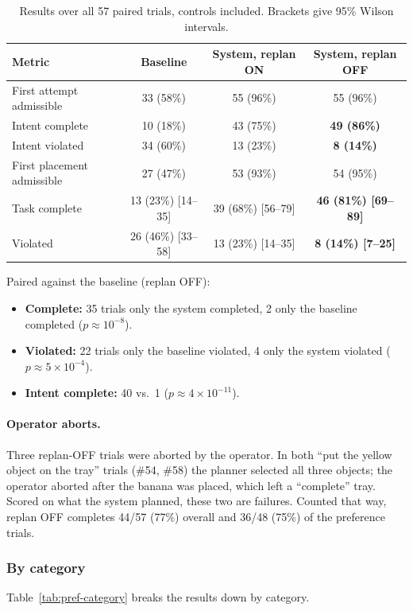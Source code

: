 \begin{table}[t]
  \centering
  \caption{Results over all 57 paired trials, controls included. Brackets give 95\%
    Wilson intervals.}
  \label{tab:pref-headline}
  \begin{tabular}{lccc}
    \toprule
    Metric & Baseline & System, replan ON & System, replan OFF \\
    \midrule
    First attempt admissible   & 33 (58\%) & 55 (96\%) & 55 (96\%) \\
    Intent complete            & 10 (18\%) & 43 (75\%) & \textbf{49 (86\%)} \\
    Intent violated            & 34 (60\%) & 13 (23\%) & \textbf{8 (14\%)} \\
    First placement admissible & 27 (47\%) & 53 (93\%) & 54 (95\%) \\
    \midrule
    Task complete & 13 (23\%) [14--35] & 39 (68\%) [56--79] & \textbf{46 (81\%) [69--89]} \\
    Violated      & 26 (46\%) [33--58] & 13 (23\%) [14--35] & \textbf{8 (14\%) [7--25]} \\
    \bottomrule
  \end{tabular}
\end{table}

Paired against the baseline (replan OFF):
\begin{itemize}
  \item \textbf{Complete:} 35 trials only the system completed, 2 only the baseline
    completed ($p \approx 10^{-8}$).
  \item \textbf{Violated:} 22 trials only the baseline violated, 4 only the system
    violated ($p \approx 5 \times 10^{-4}$).
  \item \textbf{Intent complete:} 40 vs.\ 1 ($p \approx 4 \times 10^{-11}$).
\end{itemize}

\paragraph{Operator aborts.} Three replan-OFF trials were aborted by the operator. In both
``put the yellow object on the tray'' trials (\#54, \#58) the planner selected all three
objects; the operator aborted after the banana was placed, which left a ``complete''
tray. Scored on what the system planned, these two are failures. Counted that way, replan
OFF completes 44/57 (77\%) overall and 36/48 (75\%) of the preference trials.

\subsubsection{By category}
Table~\ref{tab:pref-category} breaks the results down by category.

